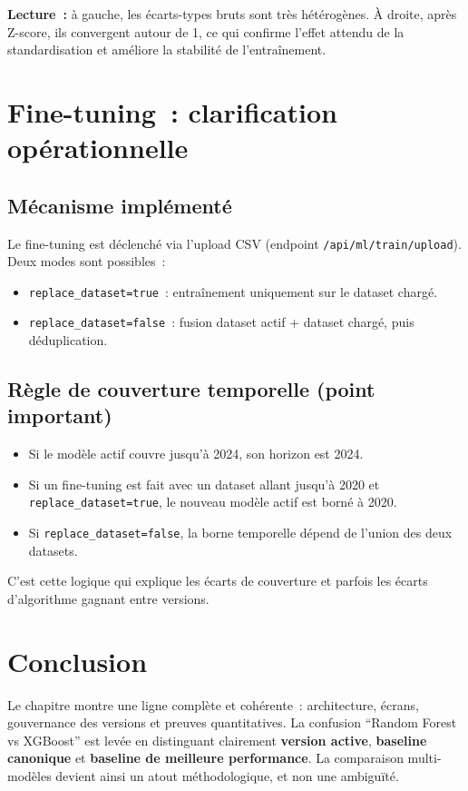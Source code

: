 \textbf{Lecture~:} à gauche, les écarts-types bruts sont très hétérogènes. À droite, après Z-score, ils convergent autour de 1, ce qui confirme l'effet attendu de la standardisation et améliore la stabilité de l'entraînement.

\section{Fine-tuning~: clarification opérationnelle}

\subsection{Mécanisme implémenté}

Le fine-tuning est déclenché via l'upload CSV (endpoint \texttt{/api/ml/train/upload}). Deux modes sont possibles~:
\begin{itemize}[leftmargin=1.5cm]
  \item \texttt{replace\_dataset=true}~: entraînement uniquement sur le dataset chargé.
  \item \texttt{replace\_dataset=false}~: fusion dataset actif + dataset chargé, puis déduplication.
\end{itemize}

\subsection{Règle de couverture temporelle (point important)}

\begin{itemize}[leftmargin=1.5cm]
  \item Si le modèle actif couvre jusqu'à 2024, son horizon est 2024.
  \item Si un fine-tuning est fait avec un dataset allant jusqu'à 2020 et \texttt{replace\_dataset=true}, le nouveau modèle actif est borné à 2020.
  \item Si \texttt{replace\_dataset=false}, la borne temporelle dépend de l'union des deux datasets.
\end{itemize}

C'est cette logique qui explique les écarts de couverture et parfois les écarts d'algorithme gagnant entre versions.

\section{Conclusion}

Le chapitre montre une ligne complète et cohérente~: architecture, écrans, gouvernance des versions et preuves quantitatives. La confusion ``Random Forest vs XGBoost'' est levée en distinguant clairement \textbf{version active}, \textbf{baseline canonique} et \textbf{baseline de meilleure performance}. La comparaison multi-modèles devient ainsi un atout méthodologique, et non une ambiguïté.

\newpage
